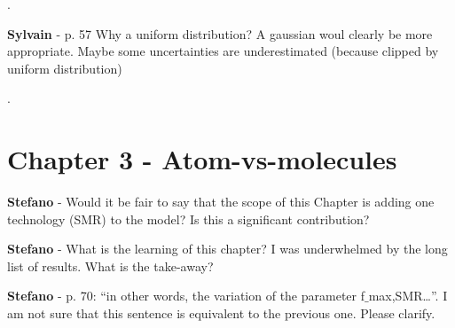 \documentclass[12pt,a4paper]{article}
\begin{document}
\noindent {\color{blue} }.

\begin{mdframed}[style=manuscript] %

\end{mdframed}

\begin{mdframed}[style=comment] %
{\color{purple} \textbf{Sylvain}} - p. 57 Why a uniform distribution? A gaussian woul clearly be more appropriate. Maybe some uncertainties are underestimated (because clipped by uniform distribution)
\end{mdframed}

\noindent {\color{blue} }.

\begin{mdframed}[style=manuscript] %

\end{mdframed}

\section{Chapter 3 - Atom-vs-molecules}
\label{Chap_atom_vs_molecules}
\begin{mdframed}[style=comment] %
{\color{orange} \textbf{Stefano}} - Would it be fair to say that the scope of this Chapter is adding one technology (SMR) to the model? Is this a significant contribution?
\end{mdframed}

\noindent 

\begin{mdframed}[style=manuscript] %

\end{mdframed}

\begin{mdframed}[style=comment] %
{\color{orange} \textbf{Stefano}} - What is the learning of this chapter? I was underwhelmed by the long list of results. What is the take-away?
\end{mdframed}

\noindent 

\begin{mdframed}[style=manuscript] %

\end{mdframed}

\begin{mdframed}[style=comment] %
{\color{orange} \textbf{Stefano}} - p. 70: ``in other words, the variation of the parameter f$\_$max,SMR…''. I am not sure that this sentence is equivalent to the previous one. Please clarify.
\end{mdframed}
\end{document}
